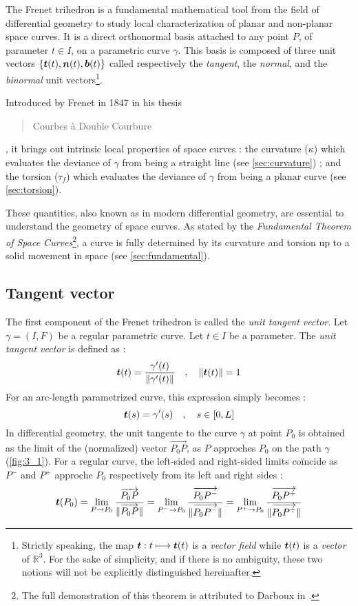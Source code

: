 The Frenet trihedron is a fundamental mathematical tool from the field of differential geometry to study local characterization of planar and non-planar space curves. It is a direct orthonormal basis attached to any point $P$, of parameter $t \in I$, on a parametric curve $\gamma$. This basis is composed of three unit vectors $\{\boldsymbol{t}(t),\boldsymbol{n}(t),\boldsymbol{b}(t)\}$ called respectively the \emph{tangent}, the \emph{normal}, and the \emph{binormal} unit vectors\footnote{
Strictly speaking, the map $\boldsymbol{t} : t \longmapsto \boldsymbol{t}(t)$ is a \emph{vector field} while $\boldsymbol{t}(t)$ is a \emph{vector} of $\mathbb{R}^3$. For the sake of simplicity, and if there is no ambiguity, these two notions will not be explicitly distinguished hereinafter.
}.

Introduced by Frenet in 1847 in his thesis \blockcquote[]{Frenet1852}{Courbes à Double Courbure}, it brings out intrinsic local properties of space curves : the curvature ($\kappa$) which evaluates the deviance of $\gamma$ from being a straight line (see \cref{sec:curvature}) ; and the torsion ($\tau_f$) which evaluates the deviance of $\gamma$ from being a planar curve (see \cref{sec:torsion}).

These quantities, also known as  in modern differential geometry, are essential to understand the geometry of space curves. As stated by the \emph{Fundamental Theorem of Space Curves}\footnote{The full demonstration of this theorem is attributed to Darboux in \cite[p.11]{Delcourt2007}.}, a curve is fully determined by its curvature and torsion up to a solid movement in space (see \cref{sec:fundamental}).

\subsection{Tangent vector}
The first component of the Frenet trihedron is called the \emph{unit tangent vector}. 
Let $\gamma = (I,F)$ be a regular parametric curve. Let $t \in I$ be a parameter. The \emph{unit tangent vector} is defined as :
\begin{equation}
	\boldsymbol{t}(t) = \frac{\gamma'(t)}{\lVert\gamma'(t)\rVert}
	\quad,\quad
	\lVert\boldsymbol{t}(t)\rVert=1
\end{equation}
For an arc-length parametrized curve, this expression simply becomes :
\begin{equation}
	\boldsymbol{t}(s) = \gamma'(s)
	\quad,\quad
	s \in [0,L]
\end{equation}
In differential geometry, the unit tangente to the curve $\gamma$ at point $P_0$ is obtained as the limit of the (normalized) vector $\overrightarrow{P_0 P}$, as $P$ approches $P_0$ on the path $\gamma$ (\cref{fig:3_1}). For a regular curve, the left-sided and right-sided limits coïncide as $P^-$ and $P^+$ approche $P_0$ respectively from its left and right sides :
\begin{equation}
	\boldsymbol{t}(P_0)
	= \lim_{P \to P_0}\frac{\overrightarrow{P_0 P}}{\lVert\overrightarrow{P_0 P}\rVert}
	= \lim_{P^- \to P_0}\frac{\overrightarrow{P_0 P^-}}{\lVert\overrightarrow{P_0 P^-}\rVert}
	= \lim_{P^+ \to P_0}\frac{\overrightarrow{P_0 P^+}}{\lVert\overrightarrow{P_0 P^+}\rVert}
\label{eq:3_4}
\end{equation}

